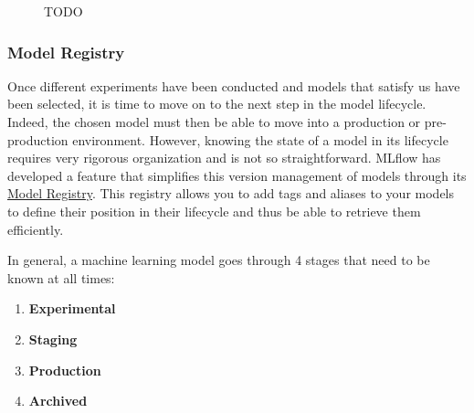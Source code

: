 \begin{figure}[htbp]
    \centering
    \caption{TODO}
    \label{fig:mlflow-tracking}
\end{figure}

\subsubsection{Model Registry}

Once different experiments have been conducted and models that satisfy us have been selected, it is time to move on to the next step in the model lifecycle. Indeed, the chosen model must then be able to move into a production or pre-production environment. However, knowing the state of a model in its lifecycle requires very rigorous organization and is not so straightforward. MLflow has developed a feature that simplifies this version management of models through its \href{https://MLflow.org/docs/latest/model-registry.html}{Model Registry}. This registry allows you to add tags and aliases to your models to define their position in their lifecycle and thus be able to retrieve them efficiently.

In general, a machine learning model goes through 4 stages that need to be known at all times:

\begin{enumerate}
    \item \textbf{Experimental}
    \item \textbf{Staging}
    \item \textbf{Production}
    \item \textbf{Archived}
\end{enumerate}

